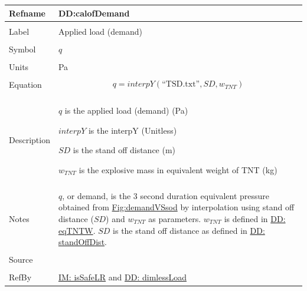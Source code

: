 \documentclass[12pt]{article}
\begin{document}
\noindent \begin{minipage}{\textwidth}
          \begin{tabular}{>{\raggedright}p{}>{\raggedright\arraybackslash}p{}}
          \toprule \textbf{Refname} & \textbf{DD:calofDemand}
          \label{DD:calofDemand}
          \\ \midrule \\
          Label & Applied load (demand)
          \\ \midrule \\
          Symbol & $q$
          \\ \midrule \\
          Units & Pa
          \\ \midrule \\
          Equation & \begin{displaymath}
                     q=interpY\left(\text{``TSD.txt''},SD,{w_{TNT}}\right)
                     \end{displaymath}
          \\ \midrule \\
          Description & \begin{symbDescription}
                        \item{$q$ is the applied load (demand) (Pa)}
                        \item{$interpY$ is the interpY (Unitless)}
                        \item{$SD$ is the stand off distance (m)}
                        \item{${w_{TNT}}$ is the explosive mass in equivalent weight of TNT (kg)}
                        \end{symbDescription}
          \\ \midrule \\
          Notes & $q$, or demand, is the 3 second duration equivalent pressure obtained from \hyperref[Figure:demandVSsod]{Fig:demandVSsod} by interpolation using stand off distance ($SD$) and ${w_{TNT}}$ as parameters. ${w_{TNT}}$ is defined in \hyperref[DD:eqTNTW]{DD: eqTNTW}. $SD$ is the stand off distance as defined in \hyperref[DD:standOffDist]{DD: standOffDist}.
          \\ \midrule \\
          Source & \cite{astm2009}
          \\ \midrule \\
          RefBy & \hyperref[IM:isSafeLR]{IM: isSafeLR} and \hyperref[DD:dimlessLoad]{DD: dimlessLoad}
          \\ \bottomrule
          \end{tabular}
          \end{minipage}
\end{document}
